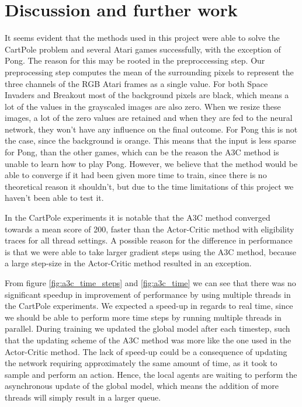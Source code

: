 \documentclass[11pt]{article}
\begin{document}
\section{Discussion and further work}

It seems evident that the methods used in this project were able
to solve the CartPole problem and several Atari games successfully,
with the exception of Pong.
The reason for this may be rooted in the preproccessing step.
Our preprocessing step computes the mean of the surrounding pixels
to represent the three channels of the RGB Atari frames as a single
value.
For both Space Invaders and Breakout most of the background pixels are
black, which means a lot of the values in the grayscaled images
are also zero.
When we resize these images, a lot of the zero values are retained
and when they are fed to the neural network, they won't have any
influence on the final outcome.
For Pong this is not the case, since the background is orange.
This means that the input is less sparse for Pong, than the other games,
which can be the reason the A3C method is unable to learn
how to play Pong.
However, we believe that the method would be able to converge if
it had been given more time to train,
since there is no theoretical reason it shouldn't,
but due to the time limitations
of this project we haven't been able to test it.

In the CartPole experiments it is notable that the A3C method converged
towards a mean score of 200, faster than the Actor-Critic method with
eligibility traces for all thread settings.
A possible reason for the difference in performance is that we were able to
take larger gradient steps using the A3C method,
because a large step-size in the Actor-Critic method 
resulted in an exception.

From figure \ref{fig:a3c_time_steps} and \ref{fig:a3c_time} we can see
that there was no significant speedup in improvement of performance by
using multiple threads in the CartPole experiments.
We expected a speed-up in regards to real time, since we should be able
to perform more time steps by running multiple threads in parallel. 
During training we updated the global model after each timestep,
such that the updating scheme of the A3C method was more like the one
used in the Actor-Critic method.
The lack of speed-up could be a consequence of updating the network requiring
approximately the same amount of time, as it took to sample and perform
an action.
Hence, the local agents are waiting to
perform the asynchronous update of the global model, which means the addition of
more threads will simply result in a larger queue.
\end{document}
